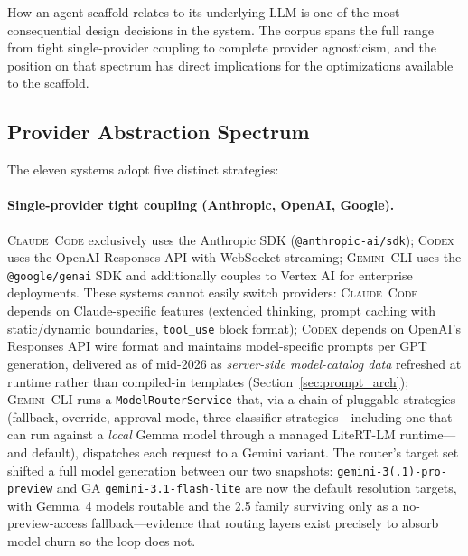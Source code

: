 \documentclass[11pt,a4paper]{article}
\newcommand{\clcode}{\textsc{Claude~Code}\xspace}
\newcommand{\cdx}{\textsc{Codex}\xspace}
\newcommand{\gemini}{\textsc{Gemini~CLI}\xspace}
\begin{document}
How an agent scaffold relates to its underlying LLM is one of the most consequential design decisions in the system.
The corpus spans the full range from tight single-provider coupling to complete provider agnosticism, and the position on that spectrum has direct implications for the optimizations available to the scaffold.

\subsection{Provider Abstraction Spectrum}

The eleven systems adopt five distinct strategies:

\paragraph{Single-provider tight coupling (Anthropic, OpenAI, Google).}
\clcode{} exclusively uses the Anthropic SDK (\texttt{@anthropic-ai/sdk}); \cdx{} uses the OpenAI Responses API with WebSocket streaming; \gemini{} uses the \texttt{@google/genai} SDK and additionally couples to Vertex AI for enterprise deployments.
These systems cannot easily switch providers: \clcode{} depends on Claude-specific features (extended thinking, prompt caching with static/dynamic boundaries, \texttt{tool\_use} block format); \cdx{} depends on OpenAI's Responses API wire format and maintains model-specific prompts per GPT generation, delivered as of mid-2026 as \emph{server-side model-catalog data} refreshed at runtime rather than compiled-in templates (Section~\ref{sec:prompt_arch}); \gemini{} runs a \texttt{ModelRouterService} that, via a chain of pluggable strategies (fallback, override, approval-mode, three classifier strategies---including one that can run against a \emph{local} Gemma model through a managed LiteRT-LM runtime---and default), dispatches each request to a Gemini variant.
The router's target set shifted a full model generation between our two snapshots: \texttt{gemini-3(.1)-pro-preview} and GA \texttt{gemini-3.1-flash-lite} are now the default resolution targets, with Gemma~4 models routable and the 2.5 family surviving only as a no-preview-access fallback---evidence that routing layers exist precisely to absorb model churn so the loop does not.
\end{document}
